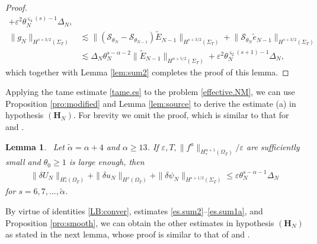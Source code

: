 \documentclass[twoside,11pt]{article}
\numberwithin{equation}{section}
\newtheorem{lemma}{Lemma}[section]
\begin{document}
\begin{proof}
\begin{align*}
		+\varepsilon^2 \theta_N^{\varsigma_4(s)-1}\varDelta_N,\\[1mm]
		\big\|g_{{N}} \big\|_{H^{s+3/2}(\Sigma_{T})}
		&\lesssim \big\|(\mathcal{S}_{\theta_{{N}}}-\mathcal{S}_{\theta_{{N}-1}})\widetilde{E}_{{N}-1}\big\|_{H^{s+3/2}(\Sigma_{T})}
		+\big\|\mathcal{S}_{\theta_{{N}}}\tilde{e}_{{N}-1}\big\|_{H^{s+3/2}(\Sigma_{T})}\\
		&\lesssim
		\varDelta_{{N}}
		\theta_{{N}}^{s-{\alpha }-2}\big\|\widetilde{E}_{{N}-1}\big\|_{H^{\alpha+5/2}(\Sigma_{T})}
		+\varepsilon^2 \theta_N^{\varsigma_2(s+1)-1}\varDelta_N,
	\end{align*}
	which together with Lemma \ref{lem:sum2} completes the proof of this lemma.
\end{proof}




Applying the tame estimate \eqref{tame.es} to the problem \eqref{effective.NM},
we can use Proposition \ref{pro:modified} and Lemma \ref{lem:source} to derive the estimate (a) in hypothesis $(\mathbf{H}_{{N}})$.
For brevity we omit the proof, which is similar to that for \cite[Lemma 16]{CS08MR2423311} and
\cite[Lemma 15]{T09ARMAMR2481071}.
\begin{lemma}\  \label{lem:Hl1}
	Let $\widetilde{\alpha}={\alpha }+4$ and ${\alpha }\geq 13$.
	If $\varepsilon,T,\|f^a\|_{H_*^{\alpha+1}(\Omega_{T})}/\varepsilon$ are sufficiently small and $\theta_0\geq 1$ is large enough, then
	\begin{align} \nonumber  %
		\|\delta U_N\|_{H_*^s(\Omega_{T})}+\|\delta u_N\|_{H^s(\Omega_{T})} +\| \delta\psi_N\|_{H^{s+1/2}(\Sigma_T)}
		\leq \varepsilon \theta_{{N}}^{s-{\alpha }-1}\varDelta_{{N}}
	\end{align}
	for $s=6,7,\ldots,\widetilde{\alpha} $.
\end{lemma}



By virtue of identities \eqref{LB:conver}, estimates \eqref{es.sum2}--\eqref{es.sum1a}, and Proposition \ref{pro:smooth},
we can obtain the other estimates in hypothesis $(\mathbf{H}_{{N}})$ as stated in the next lemma, whose proof is similar to that of  \cite[Lemmas 17--18]{CS08MR2423311} and
\cite[Lemma 16]{T09ARMAMR2481071}.
\end{document}
